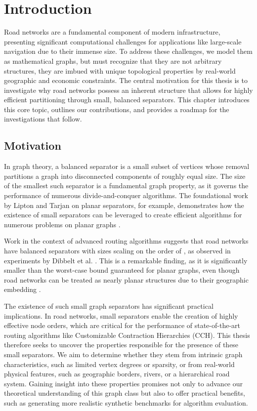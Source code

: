 \chapter{Introduction}
\label{ch:introduction}

Road networks are a fundamental component of modern infrastructure, presenting significant computational challenges for applications like large-scale navigation due to their immense size.
To address these challenges, we model them as mathematical graphs, but must recognize that they are not arbitrary structures, they are imbued with unique topological properties by real-world geographic and economic constraints.
The central motivation for this thesis is to investigate why road networks possess an inherent structure that allows for highly efficient partitioning through small, balanced separators.
This chapter introduces this core topic, outlines our contributions, and provides a roadmap for the investigations that follow.

\section{Motivation}
\label{sec:motivation}

In graph theory, a balanced separator is a small subset of vertices whose removal partitions a graph into disconnected components of roughly equal size.
The size of the smallest such separator is a fundamental graph property, as it governs the performance of numerous divide-and-conquer algorithms.
The foundational work by Lipton and Tarjan on planar separators, for example, demonstrates how the existence of small separators can be leveraged to create efficient algorithms for numerous problems on planar graphs \cite{lipton_applications_1977, lipton_separator_1979}.

Work in the context of advanced routing algorithms suggests that road networks have balanced separators with sizes scaling on the order of , as observed in experiments by Dibbelt et al. \cite{dibbelt_customizable_2016}.
This is a remarkable finding, as it is significantly smaller than the  worst-case bound guaranteed for planar graphs, even though road networks can be treated as nearly planar structures due to their geographic embedding \cite{lipton_applications_1977, lipton_separator_1979}.

The existence of such small graph separators has significant practical implications.
In road networks, small separators enable the creation of highly effective node orders, which are critical for the performance of state-of-the-art routing algorithms like Customizable Contraction Hierarchies (CCH).
This thesis therefore seeks to uncover the properties responsible for the presence of these small separators.
We aim to determine whether they stem from intrinsic graph characteristics, such as limited vertex degrees or sparsity, or from real-world physical features, such as geographic borders, rivers, or a hierarchical road system.
Gaining insight into these properties promises not only to advance our theoretical understanding of this graph class but also to offer practical benefits, such as generating more realistic synthetic benchmarks for algorithm evaluation.


